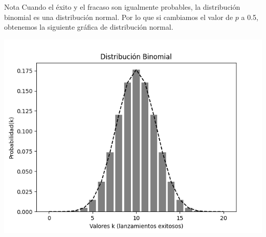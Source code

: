 \documentclass{beamer}
\begin{document}
\begin{frame}
  \begin{block}{Nota}
Cuando el éxito y el fracaso son igualmente probables, la distribución binomial
es una distribución normal. Por lo que si cambiamos el valor de $p$ a 0.5,
obtenemos la siguiente gráfica de distribución normal.
  \end{block}

  \begin{center}
    \includegraphics[scale=0.5]{figures/binomial_distribution_normal.png}
  \end{center}

\end{frame}

%    
\end{document}
